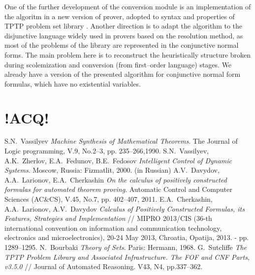 \documentclass[a4paper,12pt]{article}
\begin{document}
One of the further development of the conversion module is an implementation of the algoritm in a new version of prover, adopted to syntax and properties of TPTP problem set library \cite{tptp}.  Another direction is to adapt the algorithm to the disjunctive language widely used in provers based on the resolution method, as most of the problems of the library are represented in the conjunctive normal forms.  The main problem here is to reconstruct the heuristically structure broken during scolemization and conversion (from first--order language) stages.  We already have a version of the presented algorithm for conjunctive normal form formulas, which have no existential variables.

\section{!ACQ!}
\label{sec:acq}



\begin{thebibliography}{9}
 S.N.~Vassilyev \emph{Machine Synthesis of Mathematical Theorems}. The Journal of Logic programming, V.9, No.2--3, pp. 235--266,1990.
 S.N.~Vassilyev, A.K.~Zherlov, E.A.~Fedunov, B.E.~Fedosov \emph{Intelligent Control of Dynamic Systems}. Moscow, Russia: Fizmatlit, 2000. (in Russian)
 A.V.~Davydov, A.A.~Larionov, E.A.~Cherkashin \emph{On the calculus of positively constructed formulas for automated theorem proving}. Automatic Control and Computer Sciences (AC\&CS), V.45, No.7, pp. 402--407, 2011.
 E.A.~Cherkashin, A.A.~Larionov, A.V.~Davydov \emph{Calculus of Positively Constructed Formulas, its Features, Strategies and Implementation} // MIPRO 2013/CIS (36-th international convention on information and communication technology, electronics and microelectronics), 20-24 May 2013, Chroatia, Opatija, 2013. - pp. 1289--1295.
 N.~Bourbaki \emph{Theory of Sets}. Paris: Hermann, 1968.
 G.~Sutcliffe \emph{The TPTP Problem Library and Associated Infrastructure. The FOF and CNF Parts, v3.5.0} // Journal of Automated Reasoning. V43, N4, pp.337--362.
\end{thebibliography}
\end{document}
